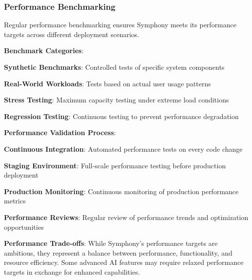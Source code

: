 \subsubsection*{Performance Benchmarking}

Regular performance benchmarking ensures Symphony meets its performance targets across different deployment scenarios.

\textbf{Benchmark Categories}:
\begin{compactlist}
    \item \textbf{Synthetic Benchmarks}: Controlled tests of specific system components
    \item \textbf{Real-World Workloads}: Tests based on actual user usage patterns
    \item \textbf{Stress Testing}: Maximum capacity testing under extreme load conditions
    \item \textbf{Regression Testing}: Continuous testing to prevent performance degradation
\end{compactlist}

\textbf{Performance Validation Process}:
\begin{compactlist}
    \item \textbf{Continuous Integration}: Automated performance tests on every code change
    \item \textbf{Staging Environment}: Full-scale performance testing before production deployment
    \item \textbf{Production Monitoring}: Continuous monitoring of production performance metrics
    \item \textbf{Performance Reviews}: Regular review of performance trends and optimization opportunities
\end{compactlist}

\begin{alertbox}
\textbf{Performance Trade-offs}: While Symphony's performance targets are ambitious, they represent a balance between performance, functionality, and resource efficiency. Some advanced AI features may require relaxed performance targets in exchange for enhanced capabilities.
\end{alertbox}